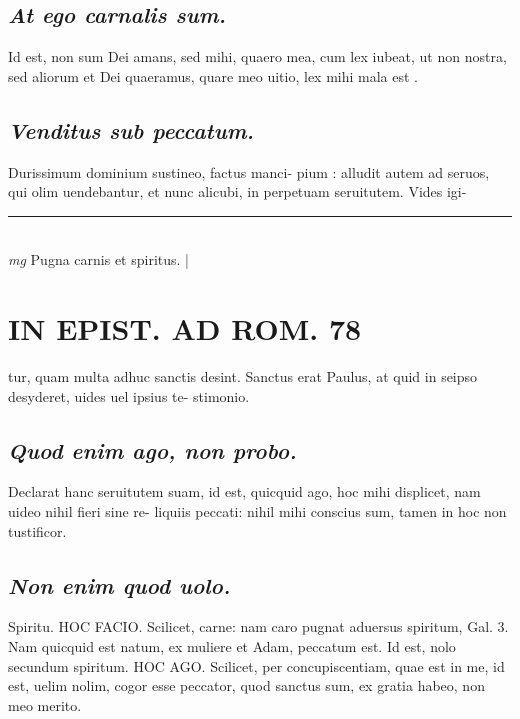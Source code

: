 \documentclass{article}
\begin{document}
\begin{pages}
\subsection*{\textit{At ego carnalis sum. }}\pstart Id est, non sum Dei amans, sed mihi, quaero mea, cum lex iubeat, ut non nostra, sed aliorum et Dei quaeramus, quare meo uitio, lex mihi mala est .   \pend
{}
{}
\subsection*{\textit{Venditus sub peccatum. }}\pstart Durissimum dominium sustineo, factus manci- pium : alludit autem ad seruos, qui olim uendebantur, et nunc alicubi, in perpetuam seruitutem. Vides igi-  \pend
\vspace{0.5cm}\noindent
\vspace{0.2cm}\rule{1cm}{0.2pt}\\ 
\hspace{0.2cm}\textit{mg}
\footnotesize Pugna carnis et spiritus.  
\normalsize| 
\section*{IN EPIST. AD ROM.  78 }
\marginpar{[ p.]}\pstart tur, quam multa adhuc sanctis desint. Sanctus erat Paulus, at quid in seipso desyderet, uides uel ipsius te- stimonio.  \pend
{}
{}
\subsection*{\textit{Quod enim ago, non probo. }}\pstart Declarat hanc seruitutem suam, id est, quicquid ago, hoc mihi displicet, nam uideo nihil fieri sine re- liquiis peccati: nihil mihi conscius sum, tamen in hoc non tustificor.   \pend
{}
{}
\subsection*{\textit{Non enim quod uolo. }}\pstart Spiritu. HOC FACIO. Scilicet, carne: nam caro pugnat aduersus spiritum, Gal. 3. Nam quicquid est natum, ex muliere et Adam, peccatum est.  \pend\pstart Id est, nolo secundum spiritum. HOC AGO.  Scilicet, per concupiscentiam, quae est in me, id est, uelim nolim, cogor esse peccator, quod sanctus sum, ex gratia habeo, non meo merito.   \pend
{}
{}

\end{pages}
\end{document}
